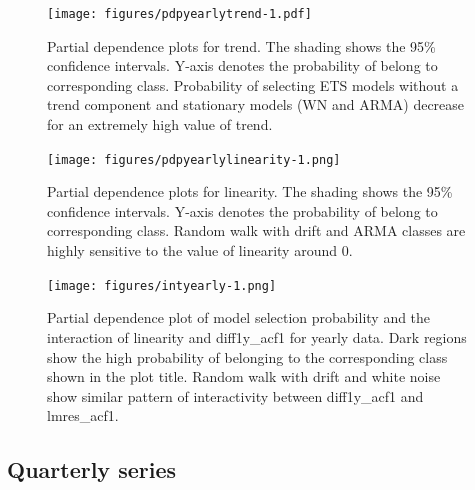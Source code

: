 \documentclass[11pt,a4paper,]{article}
\begin{document}
\begin{figure}
\centering
\texttt{[image: figures/pdpyearlytrend-1.pdf]}
\caption{\label{fig:pdpyearlytrend}Partial dependence plots for trend. The shading shows the 95\% confidence intervals. Y-axis denotes the probability of belong to corresponding class. Probability of selecting ETS models without a trend component and stationary models (WN and ARMA) decrease for an extremely high value of trend.}
\end{figure}

\begin{figure}
\centering
\texttt{[image: figures/pdpyearlylinearity-1.png]}
\caption{\label{fig:pdpyearlylinearity}Partial dependence plots for linearity. The shading shows the 95\% confidence intervals. Y-axis denotes the probability of belong to corresponding class. Random walk with drift and ARMA classes are highly sensitive to the value of linearity around 0.}
\end{figure}

\begin{figure}
\centering
\texttt{[image: figures/intyearly-1.png]}
\caption{\label{fig:intyearly}Partial dependence plot of model selection probability and the interaction of linearity and diff1y\_acf1 for yearly data. Dark regions show the high probability of belonging to the corresponding class shown in the plot title. Random walk with drift and white noise show similar pattern of interactivity between diff1y\_acf1 and lmres\_acf1.}
\end{figure}

\hypertarget{quarterly-series}{%
\subsection{Quarterly series}\label{quarterly-series}}
\end{document}
